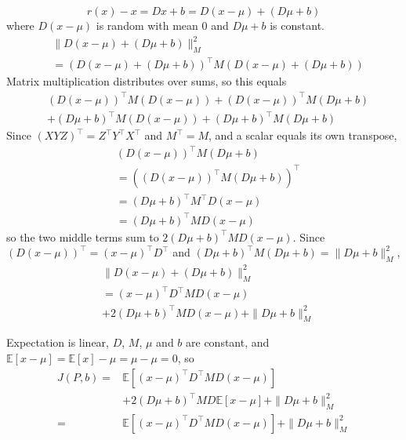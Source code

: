 \documentclass[10pt,a4paper,twocolumn]{article}
\begin{document}
	$$r(x) - x = D x + b = D (x - \mu) + (D \mu + b)$$
	where $D (x - \mu)$ is random with mean $0$ and $D \mu + b$ is constant.
	$$\begin{aligned}
		& \| D (x - \mu) + (D \mu + b) \|_M^2 \\
		& = \left( D (x - \mu) + (D \mu + b) \right)^\top M \left( D (x - \mu) + (D \mu + b) \right)
	\end{aligned}$$
	Matrix multiplication distributes over sums, so this equals
	$$\begin{aligned}
		& (D (x - \mu))^\top M (D (x - \mu)) + (D (x - \mu))^\top M (D \mu + b) \\
		& + (D \mu + b)^\top M (D (x - \mu)) + (D \mu + b)^\top M (D \mu + b)
	\end{aligned}$$
	Since $(X Y Z)^\top = Z^\top Y^\top X^\top$ and $M^\top = M$, and a scalar equals its own transpose,
	$$\begin{aligned}
		& (D (x - \mu))^\top M (D \mu + b) \\
		& = \left( (D (x - \mu))^\top M (D \mu + b) \right)^\top \\
		& = (D \mu + b)^\top M^\top D (x - \mu) \\
		& = (D \mu + b)^\top M D (x - \mu)
	\end{aligned}$$
	so the two middle terms sum to $2 (D \mu + b)^\top M D (x - \mu)$. Since $(D (x - \mu))^\top = (x - \mu)^\top D^\top$ and $(D \mu + b)^\top M (D \mu + b) = \| D \mu + b \|_M^2$,
	$$\begin{aligned}
		& \| D (x - \mu) + (D \mu + b) \|_M^2 \\
		& = (x - \mu)^\top D^\top M D (x - \mu) \\
		& + 2 (D \mu + b)^\top M D (x - \mu) + \| D \mu + b \|_M^2
	\end{aligned}$$

	Expectation is linear, $D$, $M$, $\mu$ and $b$ are constant, and $\mathbb{E}[x - \mu] = \mathbb{E}[x] - \mu = \mu - \mu = 0$, so
	$$\begin{aligned}
		J(P, b) = {} & \mathbb{E} \left[ (x - \mu)^\top D^\top M D (x - \mu) \right] \\
		& + 2 (D \mu + b)^\top M D \mathbb{E}[x - \mu] + \| D \mu + b \|_M^2 \\
		= {} & \mathbb{E} \left[ (x - \mu)^\top D^\top M D (x - \mu) \right] + \| D \mu + b \|_M^2
	\end{aligned}$$
\end{document}
